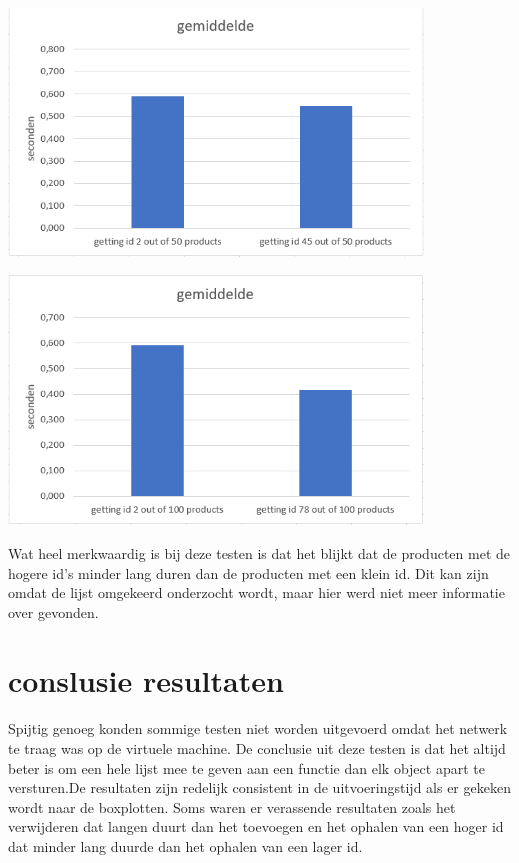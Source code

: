 \documentclass[fleqn,a4paper,12pt]{book}
\begin{document}
\begin{enumerate}
		\begin{center}
			\includegraphics[width=11cm]{img/test-column-4}\\[1cm]
		\end{center}
		\begin{center}
			\includegraphics[width=11cm]{img/test-column-5}\\[1cm]
		\end{center}
		Wat heel merkwaardig is bij deze testen is dat het blijkt dat de producten met de hogere id's minder lang duren dan de producten met een klein id. Dit kan zijn omdat de lijst omgekeerd onderzocht wordt, maar hier werd niet meer informatie over gevonden.
\end{enumerate}
\section{conslusie resultaten}
Spijtig genoeg konden sommige testen niet worden uitgevoerd omdat het netwerk te traag was op de virtuele machine. De conclusie uit deze testen is dat het altijd beter is om een hele lijst mee te geven aan een functie dan elk object apart te versturen.De resultaten zijn redelijk consistent in de uitvoeringstijd als er gekeken wordt naar de boxplotten. Soms waren er verassende resultaten zoals het verwijderen dat langen duurt dan het toevoegen en het ophalen van een hoger id dat minder lang duurde dan het ophalen van een lager id.
\end{document}

